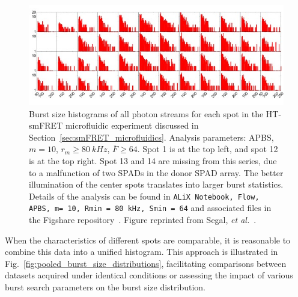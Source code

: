 \begin{figure}
\centering
\includegraphics[width=\textwidth]{chapters/figures/flow_burst_size_48_spots.jpg}
\caption{\label{fig:flow_burst_size_48_spots}
Burst size histograms of all photon streams for each spot in the \ac{HT-smFRET} microfluidic experiment discussed in Section~\ref{sec:smFRET_microfluidics}. 
Analysis parameters: \ac{APBS}, $m = 10$, $r_m \geq 80~kHz$,
$\overline{F} \geq 64$. 
Spot 1 is at the top left, and spot 12 is at the top right. 
Spot 13 and 14 are missing from this series,
due to a malfunction of two SPADs in the donor SPAD array. 
The better illumination of the center spots translates into larger burst statistics.
Details of the analysis can be found in \texttt{ALiX Notebook, Flow, \ac{APBS}, m= 10, Rmin = 80 kHz, Smin = 64} and associated files in the Figshare repository~\cite{figshare_repo_2019}. 
Figure reprinted from Segal, \textit{et al.}~\cite{segal_methods_2019}.
}
\end{figure}

When the characteristics of different spots are comparable, it is reasonable to combine this data into a unified histogram. 
This approach is illustrated in Fig.~\ref{fig:pooled_burst_size_distributions}, facilitating comparisons between datasets acquired under identical conditions or assessing the impact of various burst search parameters on the burst size distribution.

